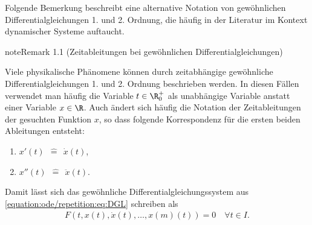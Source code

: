 \documentclass[letterpaper,10pt,german]{jupyterBook}
\begin{document}
\sphinxAtStartPar
Folgende Bemerkung beschreibt eine alternative Notation von gewöhnlichen Differentialgleichungen 1. und 2. Ordnung, die häufig in der Literatur im Kontext dynamischer Systeme auftaucht.
\label{ode/repetition:remark-1}
\begin{sphinxadmonition}{note}{Remark 1.1 (Zeitableitungen bei gewöhnlichen Differentialgleichungen)}



\sphinxAtStartPar
Viele physikalische Phänomene können durch zeitabhängige gewöhnliche Differentialgleichungen 1. und 2. Ordnung beschrieben werden.
In diesen Fällen verwendet man häufig die Variable \(t \in \R^+_0\) als unabhängige Variable anstatt einer Variable \(x \in \R\).
Auch ändert sich häufig die Notation der Zeitableitungen der gesuchten Funktion \(x\), so dass folgende Korrespondenz für die ersten beiden Ableitungen entsteht:
\begin{enumerate}
%
\item {} 
\sphinxAtStartPar
\(x'(t) \ \ \hat{=} \ \ \dot{x}(t)\),

\item {} 
\sphinxAtStartPar
\(x''(t) \ \ \hat{=} \ \ \ddot{x}(t)\).

\end{enumerate}

\sphinxAtStartPar
Damit lässt sich das gewöhnliche Differentialgleichungssystem aus \eqref{equation:ode/repetition:eq:DGL} schreiben als
\begin{equation}\label{equation:ode/repetition:eq:DGLtime}
\begin{split}F(t, x(t), \dot{x}(t), \ldots, x{(m)}(t)) = 0 \quad \forall t\in I.\end{split}
\end{equation}\end{sphinxadmonition}
\end{document}
